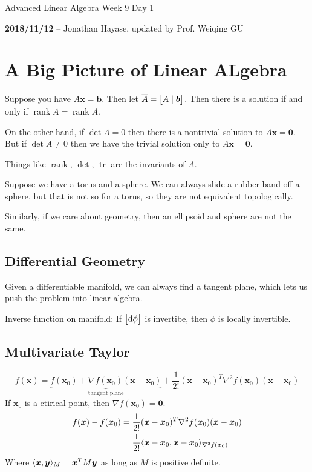 \documentclass{article}
\DeclareMathOperator{\trace}{tr}
\DeclareMathOperator{\rank}{rank}
\DeclarePairedDelimiter\ip{\langle }{\rangle}
\renewcommand{\m}[1]{\begin{bmatrix} #1 \end{bmatrix}}
\begin{document}
\begin{center}
  \Large Advanced Linear Algebra Week 9 Day 1
  \normalsize

  \textbf{2018/11/12} -- Jonathan Hayase, updated by Prof. Weiqing GU
\end{center}

\section{A Big Picture of Linear ALgebra}

Suppose you have \(A\bm x = \bm b\).
Then let \(\overline A = \sbr{A\mid \bm b}\).
Then there is a solution if and only if \(\rank A = \rank \overline A\).

On the other hand, if \(\det A = 0\) then there is a nontrivial solution to \(A \bm x = \bm 0\).
But if \(\det A \neq 0\) then we have the trivial solution only to \(A\bm x = \bm 0\).

Things like \(\rank\), \(\det\), \(\trace\) are the invariants of \(A\).

Suppose we have a torus and a sphere.
We can always slide a rubber band off a sphere, but that is not so for a torus, so they are not equivalent topologically.

Similarly, if we care about geometry, then an ellipsoid and sphere are not the same.

\subsection{Differential Geometry}

Given a differentiable manifold, we can always find a tangent plane, which lets us push the problem into linear algebra.

Inverse function on manifold: If \(\m{\dif\phi}\) is invertibe, then \(\phi\) is locally invertible.

\subsection{Multivariate Taylor}

\[f(\bm x) = \underbrace{f(\bm x_0) + \nabla f(\bm x_0)(\bm x - \bm x_0)}_{\text{tangent plane}} + \frac{1}{2!}(\bm x - \bm x_0)^T\nabla^2 f(\bm x_0)(\bm x - \bm x_0)\]
If \(\bm x_0\) is a ctirical point, then \(\nabla f(\bm x_0) = \bm 0\).
\begin{align*}
  f(\bm x) - f(\bm x_0) &= \frac{1}{2!}(\bm x - \bm x_0)^T\nabla^2 f(\bm x_0)(\bm x- \bm x_0)\\
                       &= \frac{1}{2!}\ip{\bm x- \bm x_0, \bm x - \bm x_0}_{\nabla^2f(\bm x_0)}
\end{align*}
Where \(\ip{\bm x, \bm y}_M = \bm x^TM\bm y\) as long as \(M\) is positive definite.
\end{document}
